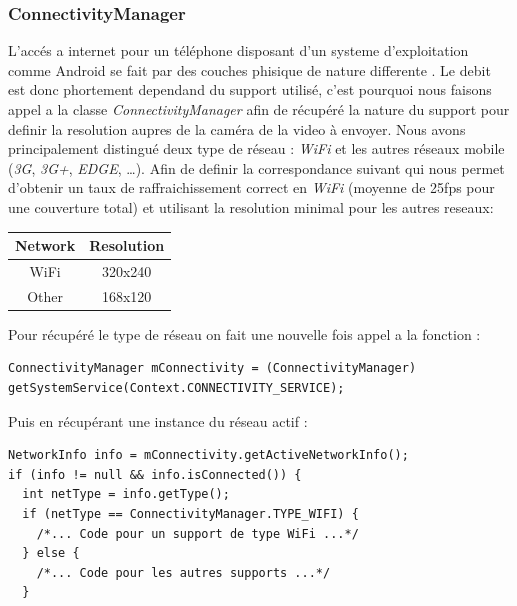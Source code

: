 \subsubsection{ConnectivityManager}
L'accés a internet pour un téléphone disposant d'un systeme d'exploitation
comme Android se fait par des couches phisique de nature differente . Le debit
est donc phortement dependand du support utilisé, c'est pourquoi nous faisons
appel a la classe \textit{ConnectivityManager} afin de récupéré la nature du
support pour definir la resolution aupres de la caméra de la video à envoyer.
Nous avons principalement distingué deux type de réseau : \textit{WiFi} et les
autres réseaux mobile (\textit{3G}, \textit{3G+}, \textit{EDGE}, \ldots).
Afin de definir la correspondance suivant qui nous permet d'obtenir un
taux de raffraichissement correct en \textit{WiFi} (moyenne de 25fps pour une
couverture total) et utilisant la resolution minimal pour les autres reseaux:
\begin{center}
\begin{tabular}{|c|c|}
\hline
Network & Resolution \\
\hline
WiFi &320x240\\
Other &168x120\\
\hline
\end{tabular}
\newline\newline
\end{center}
Pour récupéré le type de réseau on fait une nouvelle fois appel a la
fonction :
\begin{lstlisting}
ConnectivityManager mConnectivity = (ConnectivityManager) getSystemService(Context.CONNECTIVITY_SERVICE);
\end{lstlisting}
Puis en récupérant une instance du réseau actif :
\begin{lstlisting}
NetworkInfo info = mConnectivity.getActiveNetworkInfo();
if (info != null && info.isConnected()) {
  int netType = info.getType();
  if (netType == ConnectivityManager.TYPE_WIFI) {
	/*... Code pour un support de type WiFi ...*/
  } else {
	/*... Code pour les autres supports ...*/
  }
\end{lstlisting}

